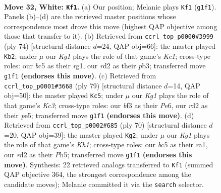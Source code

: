 \documentclass[11pt]{article}
\begin{document}
\clearpage

\begin{figure}[p]\centering
\begin{subfigure}{0.46\textwidth}\centering
\resizebox{\linewidth}{!}{%
\newchessgame
\chessboard[
  setfen={1n2k3/8/8/ppb2p2/8/P4b2/3r4/6K1 w - - 1 32},
  showmover=false,
  pgfstyle=straightmove, color=movearrow, markmove={g1-f1}
]}
\caption{}
\end{subfigure}\hfill
\begin{subfigure}{0.46\textwidth}\centering
\resizebox{\linewidth}{!}{%
\newchessgame
\chessboard[
  setfen={8/3k4/1p6/3P1p1P/8/1p5R/8/2K3r1 w - - 1 38},
  showmover=false,
  pgfstyle=straightmove, color=movearrow, markmove={c1-b2}
]}
\caption{}
\end{subfigure}
\\[4pt]
\begin{subfigure}{0.46\textwidth}\centering
\resizebox{\linewidth}{!}{%
\newchessgame
\chessboard[
  setfen={8/8/2k1p3/p3P3/3p3b/3K1B2/PP6/8 b - - 2 40},
  showmover=false,
  pgfstyle=straightmove, color=movearrow, markmove={c6-c5}
]}
\caption{}
\end{subfigure}\hfill
\begin{subfigure}{0.46\textwidth}\centering
\resizebox{\linewidth}{!}{%
\newchessgame
\chessboard[
  setfen={7k/4R3/4p2p/2p4P/2P5/8/8/r6K w - - 2 36},
  showmover=false,
  pgfstyle=straightmove, color=movearrow, markmove={h1-g2}
]}
\caption{}
\end{subfigure}
\caption{\textbf{Move 32, White: \texttt{Kf1}.} (a) Our position; Melanie plays \texttt{Kf1} (\texttt{g1f1}). Panels (b)--(d) are the retrieved master positions whose correspondence most drove this move (highest QAP objective among those that transfer to it). (b) Retrieved from \texttt{ccrl\_top\_p0000\#3999} (ply 74) [structural distance $d$=24, QAP obj=66]: the master played \texttt{Kb2}; under $\mu$ our \emph{Kg1} plays the role of that game's \emph{Kc1}; cross-type roles: our \emph{b}c5 as their \emph{r}g1, our \emph{r}d2 as their \emph{p}b3; transferred move \texttt{g1f1} \textbf{(endorses this move)}. (c) Retrieved from \texttt{ccrl\_top\_p0001\#3668} (ply 79) [structural distance $d$=14, QAP obj=50]: the master played \texttt{Kc5}; under $\mu$ our \emph{Kg1} plays the role of that game's \emph{Kc3}; cross-type roles: our \emph{b}f3 as their \emph{P}e6, our \emph{r}d2 as their \emph{p}e5; transferred move \texttt{g1f1} \textbf{(endorses this move)}. (d) Retrieved from \texttt{ccrl\_top\_p0002\#685} (ply 70) [structural distance $d$=20, QAP obj=39]: the master played \texttt{Kg2}; under $\mu$ our \emph{Kg1} plays the role of that game's \emph{Kh1}; cross-type roles: our \emph{b}c5 as their \emph{r}a1, our \emph{r}d2 as their \emph{P}h5; transferred move \texttt{g1f1} \textbf{(endorses this move)}. Synthesis: 22 retrieved analogs transferred to \texttt{Kf1} (summed QAP objective 364, the strongest correspondence among the candidate moves); Melanie committed it via the \texttt{search} selector.}
\label{fig:thought-m62}
\end{figure}
\end{document}
